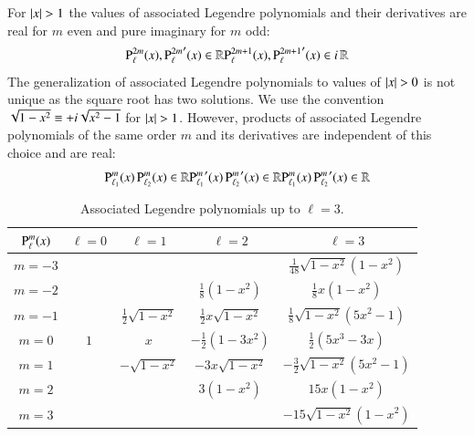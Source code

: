 For $\abs{x}>1$ the values of associated Legendre polynomials and their derivatives
are real for $m$ even and pure imaginary for $m$ odd:
\begin{equation}
{\text{P}_{\ell}^{2m}}(x),   {\text{P}_{\ell}^{2m}}^\prime(x)   \in \mathbb{R} \\
{\text{P}_{\ell}^{2m+1}}(x), {\text{P}_{\ell}^{2m+1}}^\prime(x) \in i\,\mathbb{R}
\end{equation}
The generalization of associated Legendre polynomials to values of $\abs{x}>0$
is not unique as the square root has two solutions. We use the convention
$\sqrt{1-x^2} \equiv +i \sqrt{x^2-1}$ for $\abs{x}>1$. However, products
of associated Legendre polynomials of the same order $m$ and its derivatives are independent of this
choice and are real:
\begin{equation}
{\text{P}_{\ell_1}^{m}}(x) \, {\text{P}_{\ell_2}^{m}}(x) \in \mathbb{R} \\
{\text{P}_{\ell_1}^{m}}^\prime(x) \, {\text{P}_{\ell_2}^{m}}^\prime(x) \in \mathbb{R} \\
{\text{P}_{\ell_1}^{m}}(x) \, {\text{P}_{\ell_2}^{m}}^\prime(x) \in \mathbb{R}
\end{equation}

\begin{table}
\begin{center}
\begin{tabular}{|c|c|c|c|c|}
\hline
${\text{P}_{\ell}^{m}}(x)$ & $\ell=0$ & $\ell=1$ & $\ell=2$ & $\ell=3$ \\
\hline
$m=-3$ & & & & $\tfrac{1}{48} \sqrt{1-x^2} (1-x^2)$ \\
\hline
$m=-2$ & & & $\tfrac{1}{8} (1-x^2)$ & $\tfrac{1}{8} x (1-x^2)$ \\
\hline
$m=-1$ & & $\tfrac{1}{2} \sqrt{1-x^2}$ & $\frac{1}{2} x \sqrt{1-x^2}$ & $\tfrac{1}{8} \sqrt{1-x^2} (5x^2-1)$ \\
\hline
$m=0$ & $1$ & $x$ & $-\tfrac{1}{2} (1-3x^2)$ & $\tfrac{1}{2} (5x^3-3x)$ \\
\hline
$m=1$ & & $-\sqrt{1-x^2}$ & $-3x \sqrt{1-x^2}$ & $-\tfrac{3}{2} \sqrt{1-x^2} (5x^2-1)$ \\
\hline
$m=2$ & & & $3(1-x^2)$ & $15x (1-x^2)$\\
\hline
$m=3$ & & & & $-15 \sqrt{1-x^2} (1-x^2)$\\
\hline
\end{tabular}
\caption{Associated Legendre polynomials up to $\ell=3$.}
\label{tab:appendix_plm}
\end{center}
\end{table}


